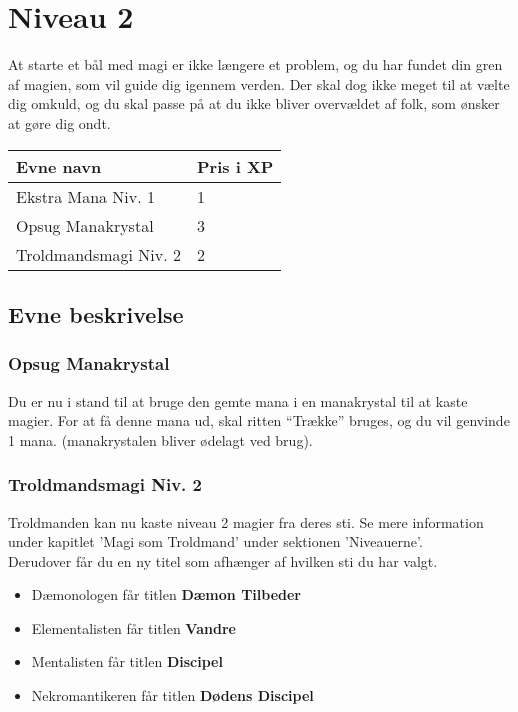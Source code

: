 \chapter{Niveau 2}
At starte et bål med magi er ikke længere et problem, og du har fundet din gren af magien, som vil guide dig igennem verden. Der skal dog ikke meget til at vælte dig omkuld, og du skal passe på at du ikke bliver overvældet af folk, som ønsker at gøre dig ondt.

\begin{table}[H]
    \centering
    \begin{tabular}{|p{}|p{}|}
    \rowcolor{cerulean!80}\hline
    Evne navn & Pris i XP \\\hline
        Ekstra Mana Niv. 1 & 1 \\\hline
        Opsug Manakrystal & 3\\\hline
        Troldmandsmagi Niv. 2 & 2\\\hline
    \end{tabular}
\end{table}
\section{Evne beskrivelse}



\subsection{Opsug Manakrystal}
Du er nu i stand til at bruge den gemte mana i en manakrystal til at kaste magier. For at få denne mana ud, skal ritten “Trække” bruges, og du vil genvinde 1 mana. (manakrystalen bliver ødelagt ved brug).

\subsection{Troldmandsmagi Niv. 2}
Troldmanden kan nu kaste niveau 2 magier fra deres sti. Se mere information under kapitlet 'Magi som Troldmand' under sektionen 'Niveauerne'. \\
Derudover får du en ny titel som afhænger af hvilken sti du har valgt.\\
\begin{itemize}
    \item Dæmonologen får titlen \textbf{Dæmon Tilbeder}
    \item Elementalisten får titlen \textbf{Vandre}
    \item Mentalisten får titlen \textbf{Discipel}
    \item Nekromantikeren får titlen \textbf{Dødens Discipel}
\end{itemize}